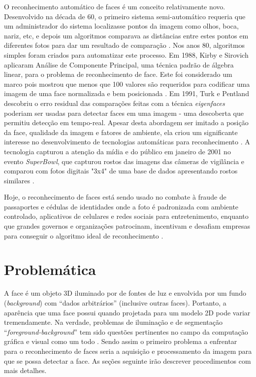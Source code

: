 O reconhecimento automático de faces é um conceito relativamente novo. Desenvolvido na década de 60, o primeiro sistema semi-automático requeria que um administrador do sistema localizasse pontos da imagem como olhos, boca, nariz,  etc, e depois um algoritmos comparava as distâncias entre estes pontos em diferentes fotos para dar um resultado de comparação \cite{nstc_homeland}. Nos anos 80, algoritmos simples foram criados para automatizar este processo. Em 1988, Kirby e Sirovich aplicaram Análise de Componente Principal, uma técnica padrão de álgebra linear, para o problema de reconhecimento de face. Este foi considerado um marco pois mostrou que menos que 100 valores são requeridos para codificar uma imagem de uma face normalizada e bem posicionada \cite{nstc_homeland}. Em 1991, Turk e Pentland descobriu o erro residual das comparações feitas com a técnica \textit{eigenfaces} poderiam ser usadas para detectar faces em uma imagem - uma descoberta que permitiu detecção em tempo-real. Apesar desta abordagem ser imitado a posição da face, qualidade da imagem e fatores de ambiente, ela criou um significante interesse no desenvolvimento de tecnologias automáticas para reconhecimento \cite{nstc_homeland}. A tecnologia capturou a atenção da mídia e do público em janeiro de 2001 no evento \textit{SuperBowl}, que capturou rostos das imagens das câmeras de vigilância e comparou com fotos digitais "3x4" de uma base de dados apresentando rostos similares \cite{nstc_homeland}.

Hoje, o reconhecimento de faces está sendo usado no combate à fraude de passaportes e cédulas de identidades onde a foto é padronizada com ambiente controlado, aplicativos de celulares e redes sociais para entretenimento, enquanto que grandes governos e organizações patrocinam, incentivam e desafiam empresas para conseguir o algoritmo ideal de reconhecimento \cite{nyu_ccpr_frt}.



\section{Problemática}\label{sec:problematica}

A face é um objeto 3D iluminado por de fontes de luz e envolvida por um fundo (\textit{background}) com “dados arbitrários” (inclusive outras faces). Portanto, a aparência que uma face possui quando projetada para um modelo 2D pode variar tremendamente. Na verdade, problemas de iluminação e de segmentação “\textit{foreground-background}” tem sido questões pertinentes no campo da computação gráfica e visual como um todo \cite{tony_columbia}. Sendo assim o primeiro problema a enfrentar para o reconhecimento de faces seria a aquisição e processamento da imagem para que se possa detectar a face. As seções seguinte irão descrever procedimentos com mais detalhes. 


